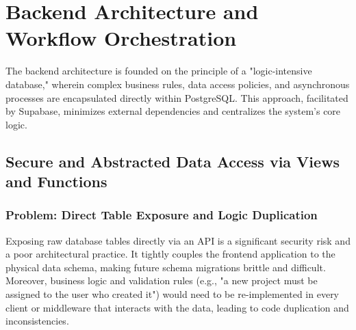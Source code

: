 \section{Backend Architecture and Workflow Orchestration}
\label{sec:backend_architecture}

The backend architecture is founded on the principle of a "logic-intensive database," wherein complex business rules, data access policies, and asynchronous processes are encapsulated directly within PostgreSQL. This approach, facilitated by Supabase, minimizes external dependencies and centralizes the system's core logic.

\subsection{Secure and Abstracted Data Access via Views and Functions}
\label{subsec:secure_data_access}

\subsubsection{Problem: Direct Table Exposure and Logic Duplication}
Exposing raw database tables directly via an API is a significant security risk and a poor architectural practice. It tightly couples the frontend application to the physical data schema, making future schema migrations brittle and difficult. Moreover, business logic and validation rules (e.g., "a new project must be assigned to the user who created it") would need to be re-implemented in every client or middleware that interacts with the data, leading to code duplication and inconsistencies.

